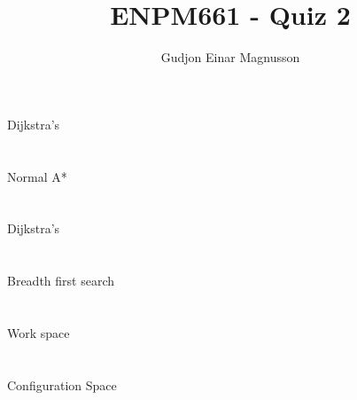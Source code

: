\documentclass[12pt]{article}
\begin{document}
\title{ENPM661 - Quiz 2}
\author{Gudjon Einar Magnusson}

\maketitle

\section{} %

Dijkstra's


\section{} %

Normal A*


\section{} %

Dijkstra's


\section{} %

Breadth first search


\section{} %

Work space


\section{} %

Configuration Space
\end{document}
